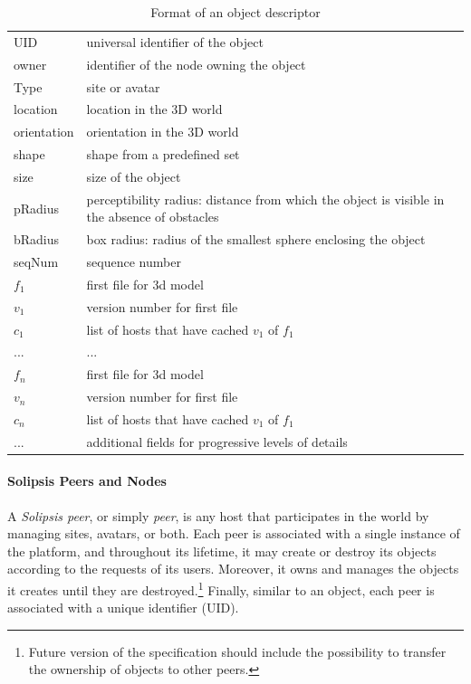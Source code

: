 \begin{table}
\centering
\begin{tabular}{|l|p{8cm}|}
\hline
  UID & universal identifier of the object\\
  owner & identifier of the node owning the object\\
  Type & site or avatar\\
  location & location in the 3D world\\
  orientation & orientation in the 3D world\\
  shape& shape from a predefined set\\
  size & size of the object\\
  pRadius & perceptibility radius: distance from which the object is
  visible in the absence   of obstacles\\
  bRadius & box radius: radius of the smallest sphere enclosing the object\\
  \hline
  seqNum & sequence number\\
  \hline
  $f_1$& first file for 3d model\\
  $v_1$& version number for first file\\
  $c_1$& list of hosts that have cached $v_1$ of $f_1$\\
  ...& ...\\
  $f_n$& first file for 3d model\\
  $v_n$& version number for first file\\
  $c_n$& list of hosts that have cached $v_1$ of $f_1$\\
  \hline
  ... & additional fields for progressive levels of details\\
  \hline
\end{tabular}

\caption{Format of an object descriptor}
\label{tab:desc}
\end{table}

\paragraph{Solipsis Peers and Nodes}
A \emph{Solipsis peer}, or simply \emph{peer}, is any host that
participates in the \sol world by managing sites, avatars, or
both. Each peer is associated with a single instance of the \sol
platform, and throughout its lifetime, it may create or destroy its
objects according to the requests of its users. Moreover, it owns and
manages the objects it creates until they are
destroyed.\footnote{Future version of the specification should include
  the possibility to transfer the ownership of objects to other
  peers.} Finally, similar to an object, each peer is associated with
a unique identifier (UID).

